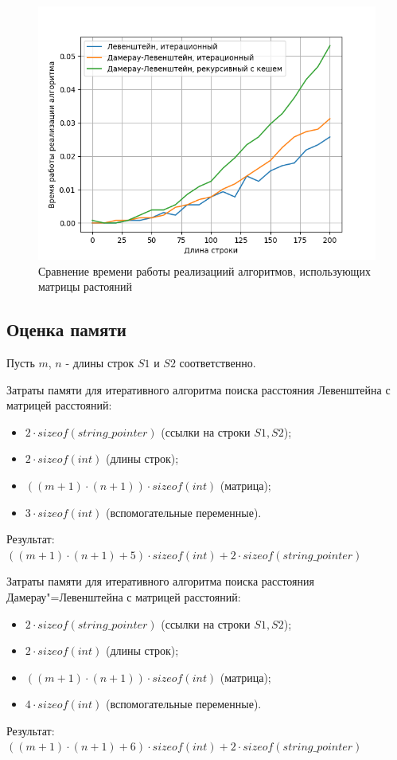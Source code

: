  \begin{figure}[h!btp]
    \captionsetup{justification=centering}
	\centering
	\includegraphics[width=400pt]{inc/time_w_matr.png}
	\caption{Сравнение времени работы реализациий алгоритмов, использующих матрицы растояний}
	\label{fig:time_w_matr}	
\end{figure}

\subsection{Оценка памяти}

Пусть $m$, $n$ - длины строк $S1$ и $S2$ соответственно. 

Затраты памяти для итеративного алгоритма поиска расстояния Левенштейна с матрицей расстояний:
	\begin{itemize}
		\item $2 \cdot sizeof(string\_pointer)$ (ссылки на строки $S1, S2$);
		\item $2 \cdot sizeof(int)$ (длины строк);
		\item $((m + 1) \cdot (n + 1)) \cdot sizeof(int)$ (матрица);
		\item $3 \cdot sizeof(int)$ (вспомогательные переменные).
	\end{itemize}
	Результат: $((m + 1) \cdot (n + 1) + 5) \cdot sizeof(int) + 2 \cdot sizeof(string\_pointer)$

Затраты памяти для итеративного алгоритма поиска расстояния Дамерау"=Левенштейна с матрицей расстояний:
	\begin{itemize}
		\item $2 \cdot sizeof(string\_pointer)$ (ссылки на строки $S1, S2$);
		\item $2 \cdot sizeof(int)$ (длины строк);
		\item $((m + 1) \cdot (n + 1)) \cdot sizeof(int)$ (матрица);
		\item $4 \cdot sizeof(int)$ (вспомогательные переменные).
	\end{itemize}
	Результат: $((m + 1) \cdot (n + 1) + 6) \cdot sizeof(int) + 2 \cdot sizeof(string\_pointer)$

